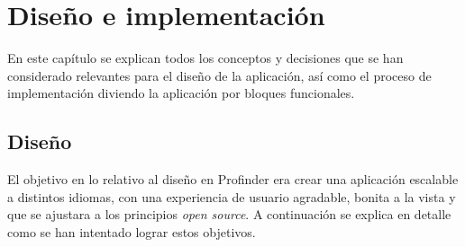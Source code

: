 \chapter{Diseño e implementación}
\label{cap:disenoEImpl}
En este capítulo se explican todos los conceptos y decisiones que se han considerado relevantes para el diseño de la aplicación, así como el proceso de implementación diviendo la aplicación por bloques funcionales.

\section{Diseño}
El objetivo en lo relativo al diseño en Profinder era crear una aplicación escalable a distintos idiomas, con una experiencia de usuario agradable, bonita a la vista y que se ajustara a los principios \textit{open source}. A continuación se explica en detalle como se han intentado lograr estos objetivos.

